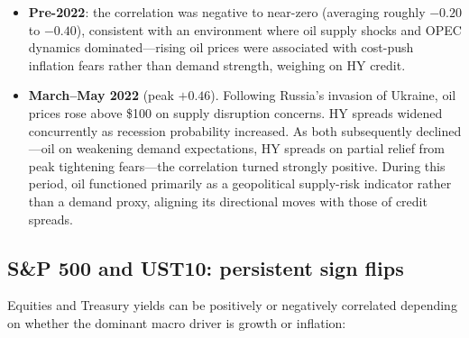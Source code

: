 \begin{itemize}
  \item \textbf{Pre-2022}: the correlation was negative to near-zero (averaging
    roughly \(-0.20\) to \(-0.40\)), consistent with an environment where oil
    supply shocks and OPEC dynamics dominated---rising oil prices were
    associated with cost-push inflation fears rather than demand strength,
    weighing on HY credit.

  \item \textbf{March--May 2022} (peak \(+0.46\)). Following Russia's invasion
    of Ukraine, oil prices rose above \$100 on supply disruption concerns. HY
    spreads widened concurrently as recession probability increased. As both
    subsequently declined---oil on weakening demand expectations, HY spreads on
    partial relief from peak tightening fears---the correlation turned strongly
    positive. During this period, oil functioned primarily as a geopolitical
    supply-risk indicator rather than a demand proxy, aligning its
    directional moves with those of credit spreads.
\end{itemize}

\subsection*{S\&P 500 and UST10: persistent sign flips}

Equities and Treasury yields can be positively or negatively correlated
depending on whether the dominant macro driver is growth or inflation:

